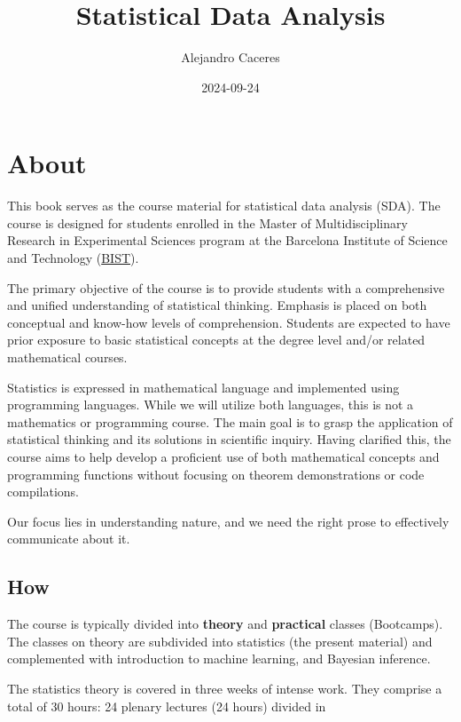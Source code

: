 \documentclass[
]{book}
\title{Statistical Data Analysis}
\author{Alejandro Caceres}
\date{2024-09-24}
\begin{document}
\maketitle

{
\setcounter{tocdepth}{1}
\tableofcontents
}
\hypertarget{about}{%
\chapter{About}\label{about}}

This book serves as the course material for statistical data analysis (SDA). The course is designed for students enrolled in the Master of Multidisciplinary Research in Experimental Sciences program at the Barcelona Institute of Science and Technology (\href{https://bist.eu/}{BIST}).

The primary objective of the course is to provide students with a comprehensive and unified understanding of statistical thinking. Emphasis is placed on both conceptual and know-how levels of comprehension. Students are expected to have prior exposure to basic statistical concepts at the degree level and/or related mathematical courses.

Statistics is expressed in mathematical language and implemented using programming languages. While we will utilize both languages, this is not a mathematics or programming course. The main goal is to grasp the application of statistical thinking and its solutions in scientific inquiry. Having clarified this, the course aims to help develop a proficient use of both mathematical concepts and programming functions without focusing on theorem demonstrations or code compilations.

Our focus lies in understanding nature, and we need the right prose to effectively communicate about it.

\hypertarget{how}{%
\section{How}\label{how}}

The course is typically divided into \textbf{theory} and \textbf{practical} classes (Bootcamps). The classes on theory are subdivided into statistics (the present material) and complemented with introduction to machine learning, and Bayesian inference.

The statistics theory is covered in three weeks of intense work. They comprise a total of 30 hours: 24 plenary lectures (24 hours) divided in
\end{document}

